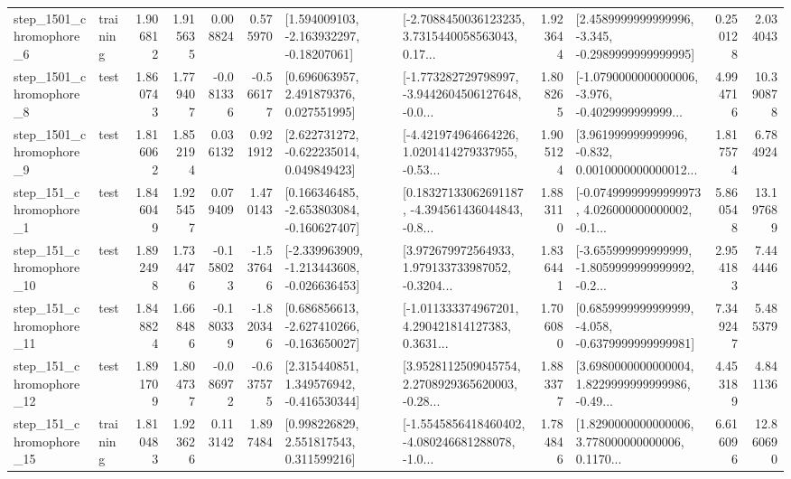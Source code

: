 \begin{tabular}{llrrrrllrlrr}
  step\_1501\_chromophore\_6 &  training &      1.906812 &    1.915635 &      0.008824 &  0.575970 &    [1.594009103, -2.163932297, -0.18207061] &  [-2.7088450036123235, 3.7315440058563043, 0.17... &       1.923644 &  [2.4589999999999996, -3.345, -0.2989999999999995] &            0.250128 &          2.034043 \\
  step\_1501\_chromophore\_8 &      test &      1.860743 &    1.779407 &     -0.081336 & -0.566177 &     [0.696063957, 2.491879376, 0.027551995] &  [-1.773282729798997, -3.9442604506127648, -0.0... &       1.808265 &  [-1.0790000000000006, -3.976, -0.4029999999999... &            4.994716 &         10.390878 \\
  step\_1501\_chromophore\_9 &      test &      1.816062 &    1.852194 &      0.036132 &  0.921912 &    [2.622731272, -0.622235014, 0.049849423] &  [-4.421974964664226, 1.0201414279337955, -0.53... &       1.905124 &  [3.961999999999996, -0.832, 0.0010000000000012... &            1.817574 &          6.784924 \\
   step\_151\_chromophore\_1 &      test &      1.846049 &    1.925457 &      0.079409 &  1.470143 &   [0.166346485, -2.653803084, -0.160627407] &  [0.18327133062691187, -4.394561436044843, -0.8... &       1.883110 &  [-0.07499999999999973, 4.026000000000002, -0.1... &            5.860548 &         13.197689 \\
  step\_151\_chromophore\_10 &      test &      1.892498 &    1.734476 &     -0.158023 & -1.537646 &  [-2.339963909, -1.213443608, -0.026636453] &  [3.972679972564933, 1.979133733987052, -0.3204... &       1.836441 &  [-3.655999999999999, -1.8059999999999992, -0.2... &            2.954183 &          7.444446 \\
  step\_151\_chromophore\_11 &      test &      1.848824 &    1.668486 &     -0.180339 & -1.820346 &   [0.686856613, -2.627410266, -0.163650027] &  [-1.011333374967201, 4.290421814127383, 0.3631... &       1.706080 &  [0.6859999999999999, -4.058, -0.6379999999999981] &            7.349247 &          5.485379 \\
  step\_151\_chromophore\_12 &      test &      1.891709 &    1.804737 &     -0.086972 & -0.637575 &    [2.315440851, 1.349576942, -0.416530344] &  [3.9528112509045754, 2.2708929365620003, -0.28... &       1.883377 &  [3.6980000000000004, 1.8229999999999986, -0.49... &            4.453189 &          4.841136 \\
  step\_151\_chromophore\_15 &  training &      1.810483 &    1.923626 &      0.113142 &  1.897484 &     [0.998226829, 2.551817543, 0.311599216] &  [-1.5545856418460402, -4.080246681288078, -1.0... &       1.784846 &  [1.8290000000000006, 3.778000000000006, 0.1170... &            6.616096 &         12.860690 \\

\end{tabular}
